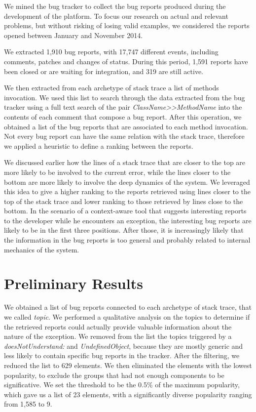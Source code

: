 We mined the \pha bug tracker to collect the bug reports produced during the development of the platform.
To focus our research on actual and relevant problems, but without risking of losing valid examples, we considered the reports opened between January and November 2014.

We extracted 1,910 bug reports, with 17,747 different events, including comments, patches and changes of status.
During this period, 1,591 reports have been closed or are waiting for integration, and 319 are still active.

We then extracted from each archetype of stack trace a list of methods invocation.
We used this list to search through the data extracted from the bug tracker using a full text search of the pair \emph{ClassName{>}{>}MethodName} into the contents of each comment that compose a bug report.
After this operation, we obtained a list of the bug reports that are associated to each method invocation.
Not every bug report can have the same relation with the stack trace, therefore we applied a heuristic to define a ranking between the reports.

We discussed earlier how the lines of a stack trace that are closer to the top are more likely to be involved to the current error, while the lines closer to the bottom are more likely to involve the deep dynamics of the system.
We leveraged this idea to give a higher ranking to the reports retrieved using lines closer to the top of the stack trace and lower ranking to those retrieved by lines close to the bottom.
In the scenario of a context-aware tool that suggests interesting reports to the developer while he encounters an exception, the interesting bug reports are likely to be in the first three positions.
After those, it is increasingly likely that the information in the bug reports is too general and probably related to internal mechanics of the system.



\section{Preliminary Results}\label{sec:stacktraces-evaluation}

We obtained a list of bug reports connected to each archetype of stack trace, that we called \emph{topic}.
We performed a qualitative analysis on the topics to determine if the retrieved reports could actually provide valuable information about the nature of the exception.
We removed from the list the topics triggered by a \emph{doesNotUnderstand:} and \emph{UndefinedObject}, because they are mostly generic and less likely to contain specific bug reports in the tracker.
After the filtering, we reduced the list to 629 elements.
We then eliminated the elements with the lowest popularity, to exclude the groups that had not enough components to be significative.
We set the threshold to be the 0.5\% of the maximum popularity, which gave us a list of 23 elements, with a significantly diverse popularity ranging from 1,585 to 9.

